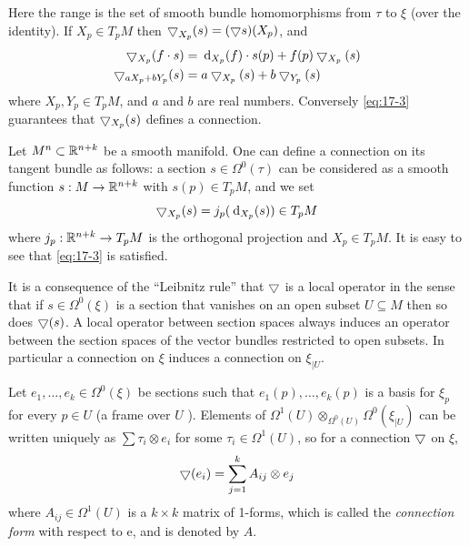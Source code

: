 Here the range is the set of smooth bundle homomorphisms from $\tau$ to $\xi$ (over the identity). 
If $X_{p} \in  {T}_{p}M$ then ${ \bigtriangledown }_{X_{p}}(s)  = ( {\bigtriangledown s}) ( X_{p})$, and
\begin{align}\label{eq:17-3}
\begin{aligned}
    \btd_{X_{p}}( {f \cdot  s})  & = \dd_{X_{p}}(f)  \cdot  s(p)  + f(p) \btd_{X_{p}}(s)\\
    \btd_{aX_{p} + b{Y}_{p}}(s)  & = a\btd_{X_{p}}(s)  + b\btd_{{Y}_{p}}(s)
\end{aligned}
\end{align}
where $X_{p},{Y}_{p} \in  {T}_{p}M$, and $a$ and $b$ are real numbers. Conversely \eqref{eq:17-3} guarantees 
that $\bigtriangledown_{X_{p}}(s)$ defines a connection.

\begin{example}\label{example:17-2} 
  Let ${M}^{n} \subset  {\ensuremath{\mathbb{R}}}^{n + k}$ be a smooth manifold. One can define a connection 
  on its tangent bundle as follows: a section $s \in  \Omega^0( \tau )$ can be considered as a smooth
  function $s:M \rightarrow  {\ensuremath{\mathbb{R}}}^{n + k}$ with $s(p)  \in  {T}_{p}M$, and we set
  \[
    \btd_{X_{p}}(s)  = {j}_{p}( {\dd_{X_{p}}(s) })  \in  {T}_{p}M
  \]
  where ${j}_{p}:{\mathbb{R}}^{n + k} \rightarrow  {T}_{p}M$ is the orthogonal projection and $X_{p} \in  {T}_{p}M$. 
  It is easy to see that \eqref{eq:17-3} is satisfied.
\end{example}

It is a consequence of the ``Leibnitz rule'' that $\bigtriangledown$ is a local operator in the sense 
that if $s \in \Omega^0(\xi)$ is a section that vanishes on an open subset $U \subseteq  M$ then so 
does $\bigtriangledown (s)$. A local operator between section spaces always induces an operator between 
the section spaces of the vector bundles restricted to open subsets. In particular a connection on $\xi$ 
induces a connection on ${\xi }_{\mid U}$.

Let ${e}_1,\ldots,{e}_{k} \in  \Omega^0(\xi)$ be sections such that ${e}_1(p),\ldots,{e}_{k}(p)$ is a 
basis for ${\xi }_{p}$ for every $p \in  U$ (a frame over $U$ ). Elements of $\Omega^1( U) \otimes_{\Omega^0( U) }\Omega^0( {\xi }_{\mid U})$ 
can be written uniquely as $\sum {\tau }_{i} \otimes  {e}_{i}$ for some ${\tau }_{i} \in  \Omega^1( U)$, so for a 
connection $\bigtriangledown$ on $\xi$,
\begin{align}\label{eq:17-4}
\bigtriangledown ( {e}_{i})  = \sum_{{j = 1}}^{k}{A}_{ij} \otimes  {e}_{j}
\end{align}
where ${A}_{ij} \in  \Omega^1( U)$ is a $k \times  k$ matrix of 1-forms, which is called the \textit{connection form} 
with respect to $\mathrm{e}$, and is denoted by $A$.

